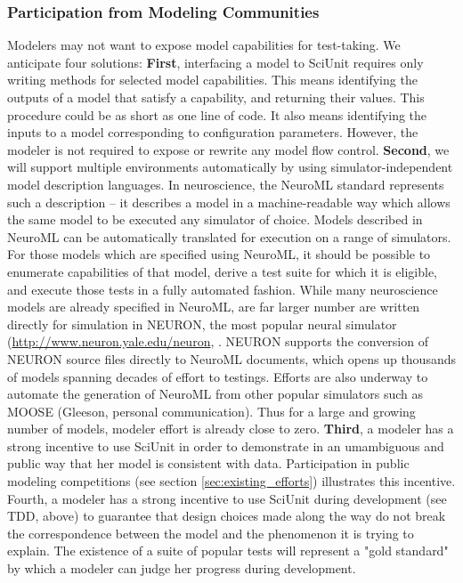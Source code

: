 \documentclass[11pt,letterpaper]{article}
\begin{document}
\subsubsection{Participation from Modeling Communities}
Modelers may not want to expose model capabilities for test-taking.  We anticipate four solutions: \textbf{First}, interfacing a model to SciUnit requires only writing methods for selected model capabilities.  This means identifying the outputs of a model that satisfy a capability, and returning their values.  This procedure could be as short as one line of code.  It also means identifying the inputs to a model corresponding to configuration parameters.  However, the modeler is not required to expose or rewrite any model flow control.  \textbf{Second}, we will support multiple environments automatically by using simulator-independent model description languages. In neuroscience, the NeuroML standard represents such a description \cite{gleeson_neuroml:_2010} -- it describes a model in a machine-readable way which allows the same model to be executed any simulator of choice.  Models described in NeuroML can be automatically translated for execution on a range of simulators.  For those models which are specified using NeuroML, it should be possible to enumerate capabilities of that model, derive a test suite for which it is eligible, and execute those tests in a fully automated fashion.  While many neuroscience models are already specified in NeuroML, are far larger number are written directly for simulation in NEURON, the most popular neural simulator (\url{http://www.neuron.yale.edu/neuron}, \cite{carnevale_neuron_2006}.  NEURON supports the conversion of NEURON source files directly to NeuroML documents, which opens up thousands of models spanning decades of effort to testings.  Efforts are also underway to automate the generation of NeuroML from other popular simulators such as MOOSE (Gleeson, personal communication).  Thus for a large and growing number of models, modeler effort is already close to zero.  \textbf{Third}, a modeler has a strong incentive to use SciUnit in order to demonstrate in an umambiguous and public way that her model is consistent with data.  Participation in public modeling competitions (see section \ref{sec:existing_efforts}) illustrates this incentive.  Fourth, a modeler has a strong incentive to use SciUnit during development (see TDD, above) to guarantee that design choices made along the way do not break the correspondence between the model and the phenomenon it is trying to explain.  The existence of a suite of popular tests will represent a "gold standard" by which a modeler can judge her progress during development.
\end{document}
